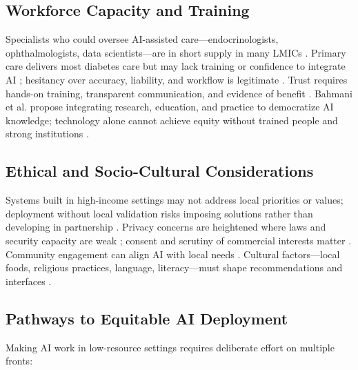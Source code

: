 \subsection{Workforce Capacity and Training}

Specialists who could oversee AI-assisted care—endocrinologists, ophthalmologists, data scientists—are in short supply in many LMICs \cite{guan2023artificial, ghosh2025artificial, raj2024federated}. Primary care delivers most diabetes care but may lack training or confidence to integrate AI \cite{mackenzie2023diabetes}; hesitancy over accuracy, liability, and workflow is legitimate \cite{guan2023artificial}. Trust requires hands-on training, transparent communication, and evidence of benefit \cite{jacobs2023artificial, mackenzie2023diabetes}. Bahmani et al. \cite{bahmani2025achieving} propose integrating research, education, and practice to democratize AI knowledge; technology alone cannot achieve equity without trained people and strong institutions \cite{mackenzie2023diabetes, bahmani2025achieving}.

\subsection{Ethical and Socio-Cultural Considerations}

Systems built in high-income settings may not address local priorities or values; deployment without local validation risks imposing solutions rather than developing in partnership \cite{ghosh2025artificial, mackenzie2023diabetes}. Privacy concerns are heightened where laws and security capacity are weak \cite{mackenzie2023diabetes, khalifa2024artificial}; consent and scrutiny of commercial interests matter \cite{fahmy2025exploring}. Community engagement can align AI with local needs \cite{mackenzie2023diabetes}. Cultural factors—local foods, religious practices, language, literacy—must shape recommendations and interfaces \cite{ghosh2025artificial, mackenzie2023diabetes}.

\subsection{Pathways to Equitable AI Deployment}

Making AI work in low-resource settings requires deliberate effort on multiple fronts:

